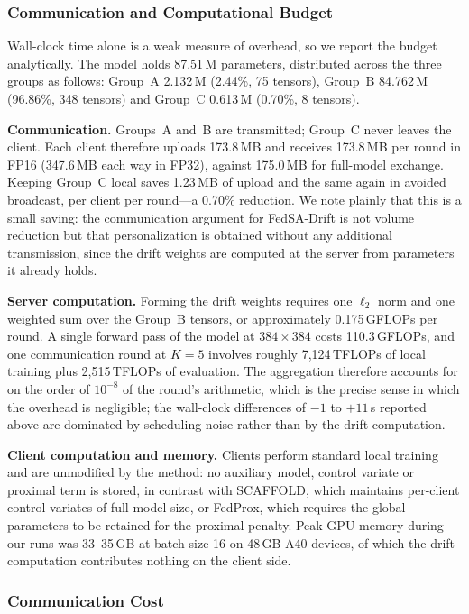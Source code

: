 \documentclass[utf8]{FrontiersinHarvard} %
\newcommand{\sadrift}{FedSA-Drift}
\begin{document}
\subsubsection{Communication and Computational Budget}
\label{sec:budget}

Wall-clock time alone is a weak measure of overhead, so we report the budget analytically. The model holds 87.51\,M parameters, distributed across the three groups as follows: Group~A 2.132\,M (2.44\%, 75 tensors), Group~B 84.762\,M (96.86\%, 348 tensors) and Group~C 0.613\,M (0.70\%, 8 tensors).

\textbf{Communication.} Groups~A and~B are transmitted; Group~C never leaves the client. Each client therefore uploads 173.8\,MB and receives 173.8\,MB per round in FP16 (347.6\,MB each way in FP32), against 175.0\,MB for full-model exchange. Keeping Group~C local saves 1.23\,MB of upload and the same again in avoided broadcast, per client per round---a 0.70\% reduction. We note plainly that this is a small saving: the communication argument for \sadrift{} is not volume reduction but that personalization is obtained without any additional transmission, since the drift weights are computed at the server from parameters it already holds.

\textbf{Server computation.} Forming the drift weights requires one $\ell_2$ norm and one weighted sum over the Group~B tensors, or approximately 0.175\,GFLOPs per round. A single forward pass of the model at $384{\times}384$ costs 110.3\,GFLOPs, and one communication round at $K{=}5$ involves roughly 7{,}124\,TFLOPs of local training plus 2{,}515\,TFLOPs of evaluation. The aggregation therefore accounts for on the order of $10^{-8}$ of the round's arithmetic, which is the precise sense in which the overhead is negligible; the wall-clock differences of $-1$ to $+11$\,s reported above are dominated by scheduling noise rather than by the drift computation.

\textbf{Client computation and memory.} Clients perform standard local training and are unmodified by the method: no auxiliary model, control variate or proximal term is stored, in contrast with SCAFFOLD, which maintains per-client control variates of full model size, or FedProx, which requires the global parameters to be retained for the proximal penalty. Peak GPU memory during our runs was 33--35\,GB at batch size 16 on 48\,GB A40 devices, of which the drift computation contributes nothing on the client side.

\subsubsection{Communication Cost}
\end{document}
